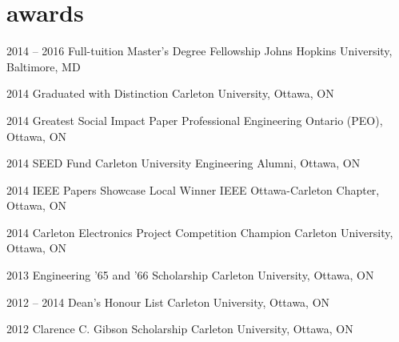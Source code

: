 \documentclass[]{friggeri-cv} %
\begin{document}
\section{awards}

\begin{entrylist}
\vspace{-7pt}
\entry
{2014 -- 2016}
{Full-tuition Master's Degree Fellowship}
{Johns Hopkins University, Baltimore, MD}
{}
\vspace{-7pt}

\entry
{2014}
{Graduated with Distinction}
{Carleton University, Ottawa, ON}
{}
\vspace{-7pt}

\entry
{2014}
{Greatest Social Impact Paper}
{Professional Engineering Ontario (PEO), Ottawa, ON}
{}
\vspace{-7pt}

\entry
{2014}
{SEED Fund}
{Carleton University Engineering Alumni, Ottawa, ON}
{}
\vspace{-7pt}

\entry
{2014}
{IEEE Papers Showcase Local Winner}
{IEEE Ottawa-Carleton Chapter, Ottawa, ON}
{}
\vspace{-7pt}

\entry
{2014}
{Carleton Electronics Project Competition Champion}
{Carleton University, Ottawa, ON}
{}
\vspace{-7pt}

\entry
{2013}
{Engineering '65 and '66 Scholarship}
{Carleton University, Ottawa, ON}
{}
\vspace{-7pt}

\entry
{2012 -- 2014}
{Dean's Honour List}
{Carleton University, Ottawa, ON}
{}
\vspace{-7pt}

\entry
{2012}
{Clarence C. Gibson Scholarship}
{Carleton University, Ottawa, ON}
{}
\vspace{-7pt}
\end{entrylist}
\end{document}
